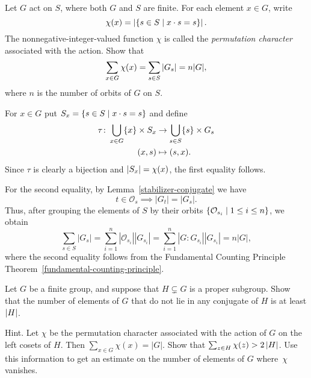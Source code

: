 \begin{probl}\label{permutation-character-equation}
    Let $G$ act on $S$, where both $G$ and $S$ are finite. For each element\/ $x\in G$, write
    $$
        \chi(x) = \left\vert{\{s\in S \mid x\cdot s = s \}}\right\vert.
    $$
    The nonnegative-integer-valued function $\chi$ is called the \textsl{permutation character} associated with the action. Show that
    $$
        \sum_{x \in G}\chi(x) = \sum_{s\in S}\left\vert{G_s}\right\vert= n|G|,
    $$
    where\/ $n$ is the number of orbits of\/ $G$ on\/ $S$.
\end{probl}

\begin{solution} For $x\in G$ put $S_x=\{s\in S\mid x\cdot s=s\}$ and define
\begin{align*}
    \tau\colon \bigcup_{x\in G}\{x\}\times S_x&\to\bigcup_{s\in S}\{s\}\times G_s\\
    (x,s) &\mapsto(s,x).
\end{align*}
Since $\tau$ is clearly a bijection and $\left\vert{S_x}\right\vert=\chi(x)$, the first equality follows.

\medskip

For the second equality, by Lemma~\ref{stabilizer-conjugate} we have
$$
    t \in \mathcal O_s \implies |G_t|=|G_s|.
$$
Thus, after grouping the elements of $S$ by their orbits $\{\mathcal O_{s_i}\mid 1\le i\le n\}$, we obtain
$$
    \sum_{s\in S}|G_s|
        = \sum_{i=1}^n|\mathcal O_{s_i}||G_{s_i}|
        =\sum_{i=1}^n|G:G_{s_i}||G_{s_i}|
        = n|G|,
$$
where the second equality follows from the Fundamental Counting Principle Theorem~\ref{fundamental-counting-principle}.

\end{solution}

\begin{probl}\label{problem-1.A.7}
    Let $G$ be a finite group, and suppose that $H \varsubsetneq G$ is a proper subgroup. Show that the number of elements of\/ $G$ that do not lie in any conjugate of\/ $H$ is at least\/ $\left\vert{H}\right\vert$.

    \textrm{\rm Hint. Let $\chi$ be the permutation character associated with the action of\/ $G$ on the left cosets of $H$. Then $\sum_{x \in G}\chi(x) = |G|$. Show that $\sum_{z \in H}\chi(z) > 2\left\vert{H}\right\vert$. Use this information to get an estimate on the number of elements of\/ $G$ where~$\chi$ vanishes.}
\end{probl}

